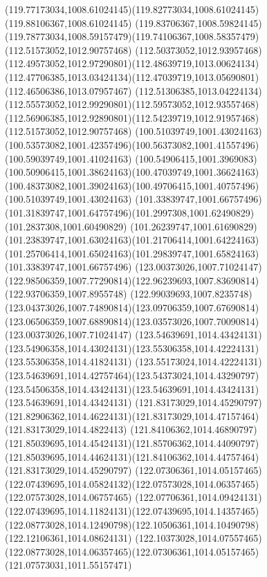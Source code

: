 {{\curveto(119.77173034,1008.61024145)(119.82773034,1008.61024145)(119.88106367,1008.61024145)
\curveto(119.83706367,1008.59824145)(119.78773034,1008.59157479)(119.74106367,1008.58357479)
\moveto(112.51573052,1012.90757468)
\curveto(112.50373052,1012.93957468)(112.49573052,1012.97290801)(112.48639719,1013.00624134)
\curveto(112.47706385,1013.03424134)(112.47039719,1013.05690801)(112.46506386,1013.07957467)
\curveto(112.51306385,1013.04224134)(112.55573052,1012.99290801)(112.59573052,1012.93557468)
\curveto(112.56906385,1012.92890801)(112.54239719,1012.91957468)(112.51573052,1012.90757468)
\moveto(100.51039749,1001.43024163)
\curveto(100.53573082,1001.42357496)(100.56373082,1001.41557496)(100.59039749,1001.41024163)
\curveto(100.54906415,1001.3969083)(100.50906415,1001.38624163)(100.47039749,1001.36624163)
\curveto(100.48373082,1001.39024163)(100.49706415,1001.40757496)(100.51039749,1001.43024163)
\moveto(101.33839747,1001.66757496)
\curveto(101.31839747,1001.64757496)(101.2997308,1001.62490829)(101.2837308,1001.60490829)
\curveto(101.26239747,1001.61690829)(101.23839747,1001.63024163)(101.21706414,1001.64224163)
\curveto(101.25706414,1001.65024163)(101.29839747,1001.65824163)(101.33839747,1001.66757496)
\moveto(123.00373026,1007.71024147)
\curveto(122.98506359,1007.77290814)(122.96239693,1007.83690814)(122.93706359,1007.8955748)
\curveto(122.99039693,1007.8235748)(123.04373026,1007.74890814)(123.09706359,1007.67690814)
\curveto(123.06506359,1007.68890814)(123.03573026,1007.70090814)(123.00373026,1007.71024147)
\moveto(123.54639691,1014.43424131)
\curveto(123.54906358,1014.43024131)(123.55306358,1014.42224131)(123.55306358,1014.41824131)
\curveto(123.55173024,1014.42224131)(123.54639691,1014.42757464)(123.54373024,1014.43290797)
\curveto(123.54506358,1014.43424131)(123.54639691,1014.43424131)(123.54639691,1014.43424131)
\moveto(121.83173029,1014.45290797)
\curveto(121.82906362,1014.46224131)(121.83173029,1014.47157464)(121.83173029,1014.4822413)
\curveto(121.84106362,1014.46890797)(121.85039695,1014.45424131)(121.85706362,1014.44090797)
\curveto(121.85039695,1014.44624131)(121.84106362,1014.44757464)(121.83173029,1014.45290797)
\moveto(122.07306361,1014.05157465)
\curveto(122.07439695,1014.05824132)(122.07573028,1014.06357465)(122.07573028,1014.06757465)
\curveto(122.07706361,1014.09424131)(122.07439695,1014.11824131)(122.07439695,1014.14357465)
\curveto(122.08773028,1014.12490798)(122.10506361,1014.10490798)(122.12106361,1014.08624131)
\curveto(122.10373028,1014.07557465)(122.08773028,1014.06357465)(122.07306361,1014.05157465)
\moveto(121.07573031,1011.55157471)
}}
